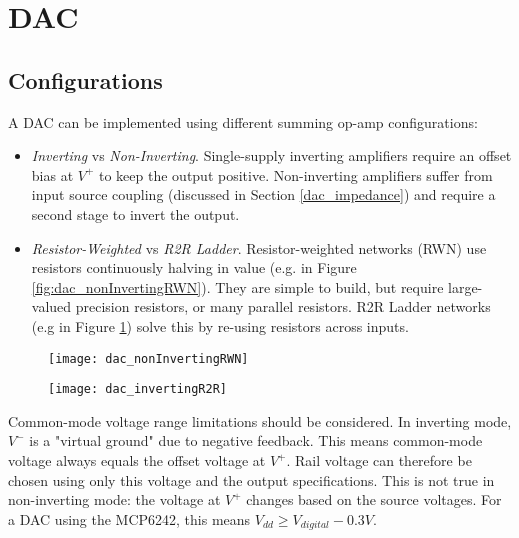 \graphicspath{{content/1_literatureReview/figures/}}
\section{DAC}\label{sec:dac}

\subsection{Configurations}

A DAC can be implemented using different summing op-amp configurations:
\begin{itemize}
    \item \textit{Inverting} vs \textit{Non-Inverting}. Single-supply inverting amplifiers require an offset bias at $V^+$ to keep the output positive.
          Non-inverting amplifiers suffer from input source coupling (discussed in Section \ref{dac_impedance}) and require a second stage to invert the output.
    \item \textit{Resistor-Weighted} vs \textit{R2R Ladder}. Resistor-weighted networks (RWN) use resistors continuously halving in value
          (e.g. in Figure \ref{fig:dac_nonInvertingRWN}). They are simple to build, but require large-valued precision resistors, or many parallel resistors.
          R2R Ladder networks (e.g in Figure \ref{fig:dac_invertingR2R}) solve this by re-using resistors across inputs.
\end{itemize}

\begin{figure}[!htb]
    \centering
    \begin{minipage}{.44\textwidth}
        \centering
        \texttt{[image: dac\_nonInvertingRWN]}
        \label{fig:dac_nonInvertingRWN}
    \end{minipage}
    \begin{minipage}{.4\textwidth}
        \centering
        \texttt{[image: dac\_invertingR2R]}
        \label{fig:dac_invertingR2R}
    \end{minipage}
\end{figure}

Common-mode voltage range limitations should be considered. In inverting mode, $V^-$ is a "virtual ground" due to negative feedback.
This means common-mode voltage always equals the offset voltage at $V^+$. Rail voltage can therefore be chosen using only this voltage
and the output specifications. This is not true in non-inverting mode: the voltage at $V^+$ changes based on the source voltages.
For a DAC using the MCP6242, this means $V_{dd} \geq V_{digital} - 0.3 V$.

